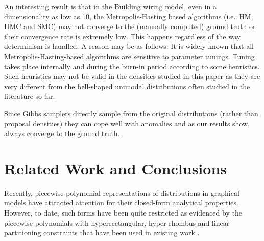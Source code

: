 \documentclass[]{article}
\begin{document}





An interesting result is that in the Building wiring model, even in a dimensionality as low as 10, 
the Metropolis-Hasting based algorithms (i.e.\ HM, HMC and SMC) may not converge to the (manually computed) ground truth or their convergence rate is extremely low. 
This happens regardless of the way determinism is handled. 
A reason may be as follows:
It is widely known that all Metropolis-Hasting-based algorithms are sensitive to parameter tunings.
Tuning takes place internally and during the burn-in period according to some heuristics.
Such heuristics may not be valid in the densities studied in this paper as they are very different from the bell-shaped unimodal distributions often studied in the literature so far.


Since Gibbs samplers directly sample from the original distributions (rather than proposal densities) they can cope well with anomalies and as our results show, always converge to the ground truth. 


 \section{Related Work and Conclusions}
\label{sect:conclusion}

Recently, piecewise polynomial representations of distributions in graphical
models have attracted attention for their closed-form analytical properties.
However, to date, such forms have been quite restricted as evidenced by
the piecewise polynomials with hyperrectangular, hyper-rhombus and
linear partitioning constraints that have been used in existing work 
\citep{shenoy2011inference,shenoy2012two,Sanner:12}.
\end{document}
